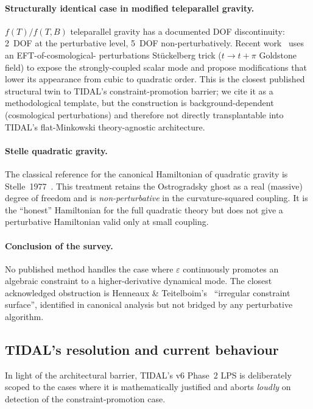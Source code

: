 \paragraph{Structurally identical case in modified teleparallel gravity.}
$f(T) / f(T,B)$ teleparallel gravity has a documented DOF discontinuity:
2~DOF at the perturbative level, 5~DOF non-perturbatively.  Recent
work~\cite{HouCaiLi2023,CaiSaridakis2024} uses an EFT-of-cosmological-
perturbations Stückelberg trick ($t \to t + \pi$ Goldstone field) to
expose the strongly-coupled scalar mode and propose modifications that
lower its appearance from cubic to quadratic order.  This is the
closest published structural twin to TIDAL's constraint-promotion
barrier; we cite it as a methodological template, but the construction
is background-dependent (cosmological perturbations) and therefore not
directly transplantable into TIDAL's flat-Minkowski theory-agnostic
architecture.

\paragraph{Stelle quadratic gravity.}
The classical reference for the canonical Hamiltonian of quadratic
gravity is Stelle~1977~\cite{Stelle1977}.  This treatment retains the
Ostrogradsky ghost as a real (massive) degree of freedom and is
\emph{non-perturbative} in the curvature-squared coupling.  It is the
``honest'' Hamiltonian for the full quadratic theory but does not give
a perturbative Hamiltonian valid only at small coupling.

\paragraph{Conclusion of the survey.}
No published method handles the case where $\varepsilon$ continuously
promotes an algebraic constraint to a higher-derivative dynamical mode.
The closest acknowledged obstruction is Henneaux \&
Teitelboim's~\cite{HenneauxTeitelboim1992} ``irregular constraint
surface'', identified in canonical analysis but not bridged by any
perturbative algorithm.

\subsection{TIDAL's resolution and current behaviour}
\label{sec:pr-cb-resolution}

In light of the architectural barrier, TIDAL's v6 Phase~2 LPS is
deliberately scoped to the cases where it is mathematically justified
and aborts \emph{loudly} on detection of the constraint-promotion case.

